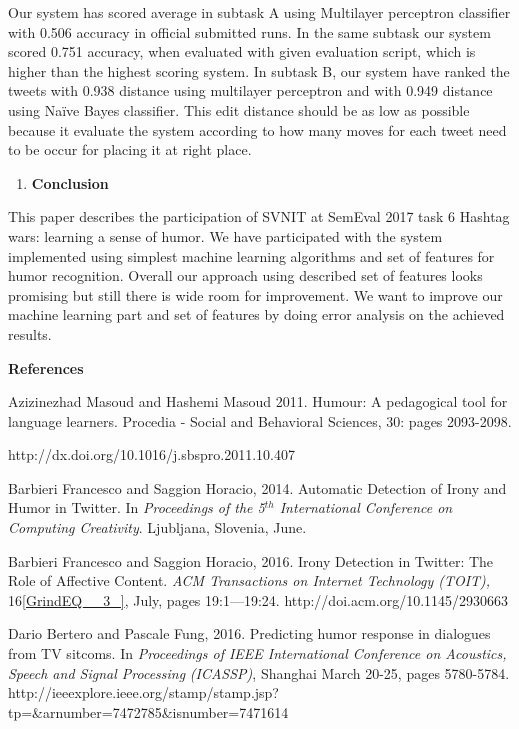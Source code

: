\documentclass{article} %
\begin{document}
Our system has scored average in subtask A using Multilayer perceptron classifier with 0.506 accuracy in official submitted runs. In the same subtask our system scored 0.751 accuracy, when evaluated with given evaluation script, which is higher than the highest scoring system. In subtask B, our system have ranked the tweets with 0.938 distance using multilayer perceptron and with 0.949 distance using Na\"{i}ve Bayes classifier.  This edit distance should be as low as possible because it evaluate the system according to how many moves for each tweet need to be occur for placing it at right place. 

\begin{enumerate}
\item  \textbf{Conclusion}
\end{enumerate}

\noindent This paper describes the participation of SVNIT at SemEval 2017 task 6 Hashtag wars: learning a sense of humor. We have participated with the system implemented using simplest machine learning algorithms and set of features for humor recognition. Overall our approach using described set of features looks promising but still there is wide room for improvement. We want to improve our machine learning part and set of features by doing error analysis on the achieved results.

\noindent \textbf{References }

\noindent Azizinezhad Masoud and Hashemi Masoud 2011.    Humour: A pedagogical tool for language learners. Procedia - Social and Behavioral Sciences, 30: pages 2093-2098.

\noindent http://dx.doi.org/10.1016/j.sbspro.2011.10.407

\noindent Barbieri Francesco and Saggion Horacio, 2014. Automatic Detection of Irony and Humor in Twitter. In \textit{Proceedings of the 5${}^{th}$ International Conference on Computing Creativity}. Ljubljana, Slovenia, June.

\noindent Barbieri Francesco and Saggion Horacio, 2016.  Irony Detection in Twitter: The Role of Affective Content. \textit{ACM Transactions on Internet Technology (TOIT),} 16\eqref{GrindEQ__3_}, July, pages 19:1---19:24. http://doi.acm.org/10.1145/2930663

\noindent Dario Bertero and Pascale Fung, 2016. Predicting humor response in dialogues from TV sitcoms. In \textit{Proceedings of IEEE International Conference on Acoustics, Speech and Signal Processing} \textit{(ICASSP)}, Shanghai March 20-25, pages 5780-5784. http://ieeexplore.ieee.org/stamp/stamp.jsp?tp=\&arnumber=7472785\&isnumber=7471614
\end{document}
